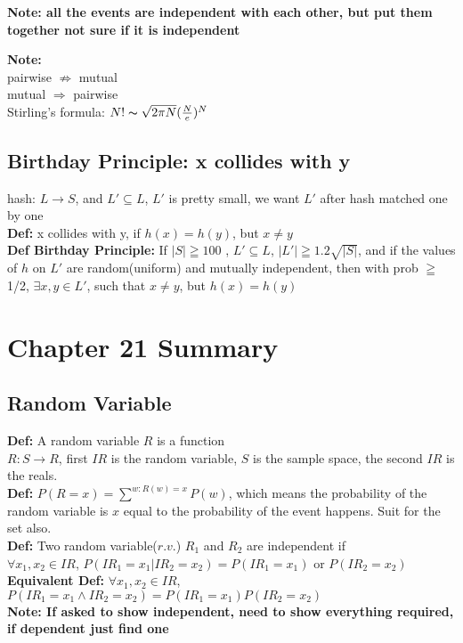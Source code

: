 \documentclass{article}
\begin{document}
\textbf{Note: all the events are independent with each other, but put them together not sure if it is independent} 

\textbf{Note:} \\
pairwise $ \nRightarrow $ mutual  \\
mutual $ \Rightarrow $ pairwise  \\


Stirling's formula: $N!\thicksim \sqrt{2\pi N}(\frac{N}{e})^N$
\subsection{Birthday Principle: x collides with y}
hash: $L\rightarrow S$, and $L'\subseteq L$, $L'$ is pretty small, we want $L'$ after hash matched one by one  \\
\textbf{Def:} x collides with y, if $h(x)=h(y)$, but $x\neq y$  \\
\textbf{Def Birthday Principle:} If $|S|\geqq 100$ , $L'\subseteq L$, $|L'|\geqq 1.2\sqrt{|S|} $, and if the values of $h$ on $L'$ are random(uniform) and mutually independent, then with prob $\geqq$ 1/2, $\exists x,y\in L'$, such that $x\neq y$, but $h(x)=h(y)$




\section{Chapter 21 Summary} 
\subsection{Random Variable}
\textbf{Def:} A random variable $R$ is a function  \\
$R:S \rightarrow R$, first $IR$ is the random variable, $S$ is the sample space, the second $IR$ is the reals. \\
\textbf{Def:} $P(R=x)=\sum^{w:R(w)=x}P(w)$, which means the probability of the random variable is $x$ equal to the probability of the event happens. Suit for the set also. \\
\textbf{Def:} Two random variable($r.v.$) $R_1$ and $R_2$ are independent if \\
$\forall x_1, x_2 \in IR$, $P(IR_1=x_1|IR_2=x_2)=P(IR_1=x_1)$ or $P(IR_2=x_2)$ \\
\textbf{Equivalent Def:} $\forall x_1, x_2 \in IR$, $P(IR_1=x_1\wedge IR_2=x_2)=P(IR_1=x_1)P(IR_2=x_2)$ \\

\textbf{Note: If asked to show independent, need to show everything required, if dependent just find one} \\
\end{document}
